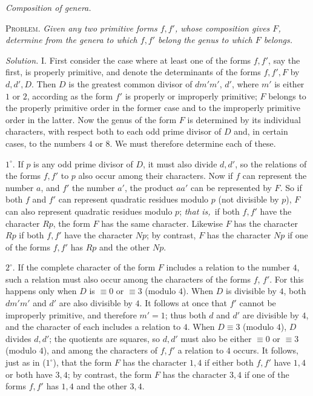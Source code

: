 \begin{center}
\textit{Composition of genera.}
\end{center}

\textsc{Problem.} \textit{Given any two primitive forms $f,f'$, whose composition gives $F$, determine from the genera to which $f,f'$ belong the genus to which $F$ belongs.}

\textit{Solution.} I. First consider the case where at least one of the forms $f,f'$, say the first, is properly primitive, and denote the determinants of the forms $f,f',F$ by $d,d',D$. Then $D$ is the greatest common divisor of $dm'm'$, $d'$, where $m'$ is either $1$ or $2$, according as the form $f'$ is properly or improperly primitive; $F$ belongs to the properly primitive order in the former case and to the improperly primitive order in the latter. Now the genus of the form $F$ is determined by its individual characters, with respect both to each odd prime divisor of $D$ and, in certain cases, to the numbers $4$ or $8$. We must therefore determine each of these.

$1^{\circ}$. If $p$ is any odd prime divisor of $D$, it must also divide $d,d'$, so the relations of the forms $f,f'$ to $p$ also occur among their characters. Now if $f$ can represent the number $a$, and $f'$ the number $a'$, the product $aa'$ can be represented by $F$. So if both $f$ and $f'$ can represent quadratic residues modulo $p$ (not divisible by $p$), $F$ can also represent quadratic residues modulo $p$; \textit{that is,}\ if both $f,f'$ have the character $Rp$, the form $F$ has the same character. Likewise $F$ has the character $Rp$ if both $f,f'$ have the character $Np$; by contrast, $F$ has the character $Np$ if one of the forms $f,f'$ has $Rp$ and the other $Np$.

$2^{\circ}$. If the complete character of the form $F$ includes a relation to the number $4$, such a relation must also occur among the characters of the forms $f$, $f'$. For this happens only when $D$ is $\equiv0$ or $\equiv3$ (modulo $4$). When $D$ is divisible by $4$, both $dm'm'$ and $d'$ are also divisible by $4$. It follows at once that $f'$ cannot be improperly primitive, and therefore $m'=1$; thus both $d$ and $d'$ are divisible by $4$, and the character of each includes a relation to $4$. When $D\equiv3$ (modulo $4$), $D$ divides $d,d'$; the quotients are squares, so $d,d'$ must also be either $\equiv0$ or $\equiv3$ (modulo $4$), and among the characters of $f,f'$ a relation to $4$ occurs. It follows, just as in ($1^{\circ}$), that the form $F$ has the character $1,4$ if either both $f,f'$ have $1,4$ or both have $3,4$; by contrast, the form $F$ has the character $3,4$ if one of the forms $f,f'$ has $1,4$ and the other $3,4$.

